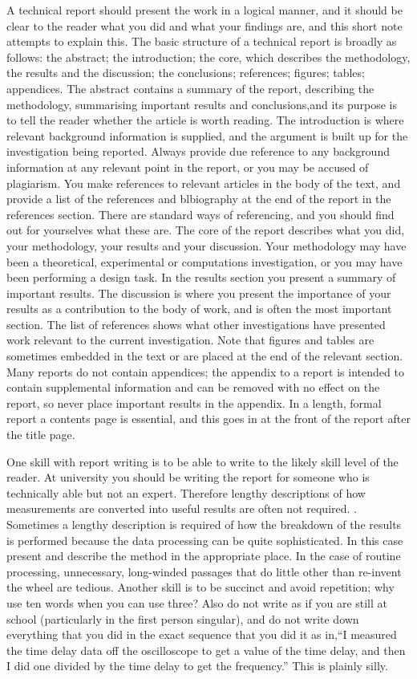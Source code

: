 \documentclass[11pt,a4]{article}
\begin{document}
A technical report should present the work in a logical manner, and it should be clear to the reader what you did and what your findings are, and this short note attempts to explain this. The basic structure of a technical report is broadly as follows: the abstract; the introduction; the core, which describes the methodology, the results and the discussion; the conclusions; references; figures; tables; appendices. The abstract contains a summary of the report, describing the methodology, summarising important results and conclusions,and its purpose is to tell the reader whether the article is worth reading. The introduction is where relevant background information is supplied, and the argument is built up for the investigation being reported. Always provide due reference to any background information at any relevant point in the report, or you may be accused of plagiarism. You make references to relevant articles in the body of the text, and provide a list of the references and blbiography at the end of the report in the references section. There are standard ways of referencing, and you should find out for yourselves what these are. The core of the report describes what you did, your methodology, your results and your discussion. Your methodology may have been a theoretical, experimental or computations investigation, or you may have been performing a design task. In the results section you present a summary of important results. The discussion is where you present the importance of your results as a contribution to the body of work, and is often the most important section. The list of references shows what other investigations have presented work relevant to the current investigation. Note that figures and tables are sometimes embedded in the text or are placed at the end of the relevant section. Many reports do not contain appendices; the appendix to a report is intended to contain supplemental information and can be removed with no effect on the report, so never place important results in the appendix. In a length, formal report a contents page is essential, and this goes in at the front of the report after the title page.

One skill with report writing is to be able to write to the likely skill level of the reader. At university you should be writing the report for someone who is technically able but not an expert. Therefore lengthy descriptions of how measurements are converted into useful results are often not required. . Sometimes a lengthy description is required of how the breakdown of the results is performed because the data processing can be quite sophisticated. In this case present and describe the method in the appropriate place. In the case of routine processing, unnecessary, long-winded passages that do little other than re-invent the wheel are tedious. Another skill is to be succinct and avoid repetition; why use ten words when you can use three? Also do not write as if you are still at school (particularly in the first person singular), and do not write down everything that you did in the exact sequence that you did it as in,``I measured the time delay data off the oscilloscope to get a value of the time delay, and then I did one divided by the time delay to get the frequency.'' This is plainly silly.
\end{document}
